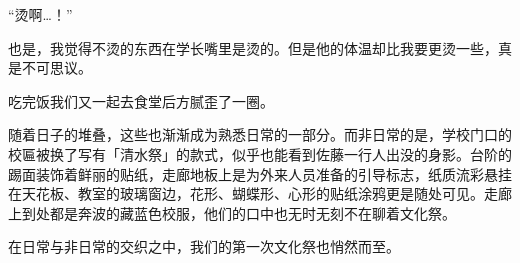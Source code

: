 “烫啊…！”

也是，我觉得不烫的东西在学长嘴里是烫的。但是他的体温却比我要更烫一些，真是不可思议。

%
%
%
%
%

吃完饭我们又一起去食堂后方腻歪了一圈。

随着日子的堆叠，这些也渐渐成为熟悉日常的一部分。而非日常的是，学校门口的校匾被换了写有「清水祭」的款式，似乎也能看到佐藤一行人出没的身影。台阶的踢面装饰着鲜丽的贴纸，走廊地板上是为外来人员准备的引导标志，纸质流彩悬挂在天花板、教室的玻璃窗边，花形、蝴蝶形、心形的贴纸涂鸦更是随处可见。走廊上到处都是奔波的藏蓝色校服，他们的口中也无时无刻不在聊着文化祭。

在日常与非日常的交织之中，我们的第一次文化祭也悄然而至。


\cutlinec

\newpage


\newday{\sakura}


{
	
}

\newpage

